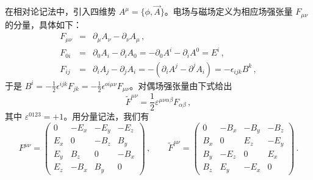 在相对论记法中，引入四维势 $A^{\mu}= \{\phi, \vec{A}\}$。电场与磁场定义为相应场强张量 $F_{\mu\nu}$ 的分量，具体如下：
\begin{eqnarray}
F_{\mu \nu} & = &\partial_{\mu}A_{\nu} - \partial_{\nu}A_{\mu}\,,
\nonumber \\
F_{0i} & = &\partial_{0}A_{i} - \partial_{i}A_{0} =
- \partial_{0}A^{i} - \partial_{i}A^{0} = E^{i}\,,\nonumber \\
F_{ij} & = & \partial_{i}A_{j} - \partial_{j}A_{i} =
- (\partial_{i}A^{j} - \partial^{j}A_{i}) =
-\epsilon_{ijk} B^{k}\,,
\label{III}
\end{eqnarray}
于是 $B^i=-\frac{1}{2}\epsilon^{ijk}F_{jk}=-\frac{1}{2}
\epsilon^{oi\mu\nu}F_{\mu\nu}$。对偶场强张量由下式给出
$$
\widetilde F^{\mu \nu} = \frac{1}{2} \varepsilon^{\mu \nu \alpha
\beta} F_{\alpha \beta}\,,
$$
其中 $\varepsilon^{0123}=+1$。用分量记法，我们有
\begin{equation}
F^{\mu \nu} =
\left(
\begin{array}{cccc}
0 & -E_{x} & -E_{y} & -E_{z}  \\
E_{x} & 0 & -B_{z} & B_{y} \\
E_{y} & B_{z} & 0 & -B_{x} \\
E_{z} & -B_{x} & B_{y} & 0
\end{array}
\right)\,,
\qquad
\widetilde F^{\mu \nu} =
\left(
\begin{array}{cccc}
0 & -B_{x} & -B_{y} & -B_{z} \\
B_{x} & 0 & E_{z} & -E_{y} \\
B_{y} & -E_{z} & 0 & E_{x} \\
B_{z} & E_{y} & -E_{x} & 0
\end{array}
\right)\,.
\label{IV}
\end{equation}


